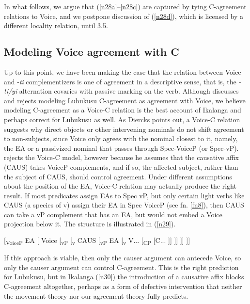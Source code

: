 \documentclass[output=paper,
modfonts
]{langscibook}
\begin{document}
In what follows, we argue that (\ref{n28a}--\ref{n28c}) are captured by tying C-agreement relations to Voice, and we postpone discussion of (\ref{n28d}), which is licensed by a different locality relation, until 3.5. 


\subsection{Modeling Voice agreement with C}
\label{sec:letsholo:3.3}
Up to this point, we have been making the case that the relation between Voice and -\textit{ti} complementizers is one of agreement in a descriptive sense, that is, the \textit{-ti/yi} alternation covaries with passive marking on the verb. Although \citet[353--370]{Diercks2010} discusses and rejects modeling Lubukusu C-agreement as agreement with Voice, we believe modeling C-agreement as a Voice-C relation is the best account of Ikalanga and perhaps correct for Lubukusu as well. As Diercks points out, a Voice-C relation suggests why direct objects or other intervening nominals do not shift agreement to non-subjects, since Voice only agrees with the nominal closest to it, namely, the EA or a passivized nominal that passes through Spec-VoiceP (or Spec-vP). \citeauthor{Diercks2010} rejects the Voice-C model, however because he assumes that the causative affix (CAUS) takes VoiceP complements, and if so, the affected subject, rather than the subject of CAUS, should control agreement. Under different assumptions about the position of the EA, Voice-C relation may actually produce the right result. If most predicates assign EAs to Spec vP, but only certain light verbs like CAUS (a species of v) assign their EA in Spec VoiceP (see fn. \ref{fn8}), then CAUS can take a vP complement that has an EA, but would not embed a Voice projection below it. The structure is illustrated in (\ref{n29}).

\ea\label{n29} \textup{[\textsubscript{VoiceP} EA  [ Voice [\textsubscript{vP} [\textsubscript{v}  CAUS [\textsubscript{vP}  EA [\textsubscript{v} V...  [\textsubscript{CP} [C... ]] ]] ]] ]]} \z 

If this approach is viable, then only the causer argument can antecede Voice, so only the causer argument can control C-agreement. This is the right prediction for Lubukusu, but in Ikalanga (\ref{n30}) the introduction of a causative affix blocks C-agreement altogether, perhaps as a form of defective intervention that neither the movement theory nor our agreement theory fully predicts.  
\end{document}
